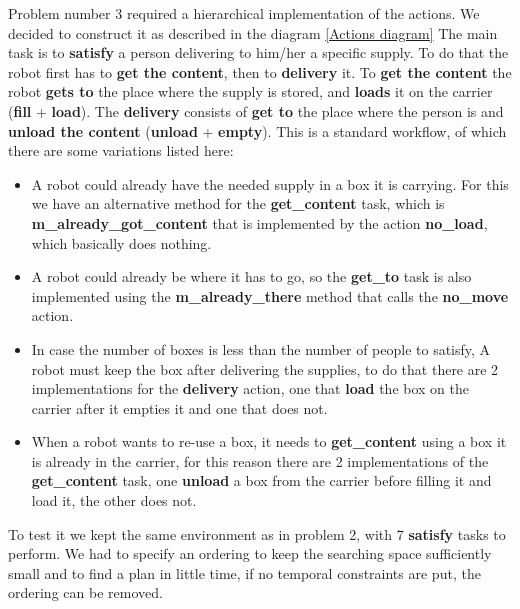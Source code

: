 Problem number 3 required a hierarchical implementation of the actions.
We decided to construct it as described in the diagram \ref{Actions diagram}
The main task is to \textbf{satisfy} a person delivering to him/her a specific supply.
To do that the robot first has to \textbf{get the content}, then to \textbf{delivery} it.
To \textbf{get the content} the robot \textbf{gets to} the place where the supply is stored, and \textbf{loads} it on the carrier (\textbf{fill} + \textbf{load}).
The \textbf{delivery} consists of \textbf{get to} the place where the person is and \textbf{unload the content} (\textbf{unload} + \textbf{empty}).
This is a standard workflow, of which there are some variations listed here:
\begin{itemize}
    \item A robot could already have the needed supply in a box it is carrying. For this we have an alternative method for the \textbf{get\_content} task, which is \textbf{m\_already\_got\_content} that is implemented by the action \textbf{no\_load}, which basically does nothing.
    \item A robot could already be where it has to go, so the \textbf{get\_to} task is also implemented using the \textbf{m\_already\_there} method that calls the \textbf{no\_move} action.
    \item In case the number of boxes is less than the number of people to satisfy, A robot must keep the box after delivering the supplies, to do that there are 2 implementations for the \textbf{delivery} action, one that \textbf{load} the box on the carrier after it empties it and one that does not.
    \item When a robot wants to re-use a box, it needs to \textbf{get\_content} using a box it is already in the carrier, for this reason there are 2 implementations of the \textbf{get\_content} task, one \textbf{unload} a box from the carrier before filling it and load it, the other does not.
\end{itemize} 
To test it we kept the same environment as in problem 2, with 7 \textbf{satisfy} tasks to perform.
We had to specify an ordering to keep the searching space sufficiently small and to find a plan in little time, if no temporal constraints are put, the ordering can be removed.